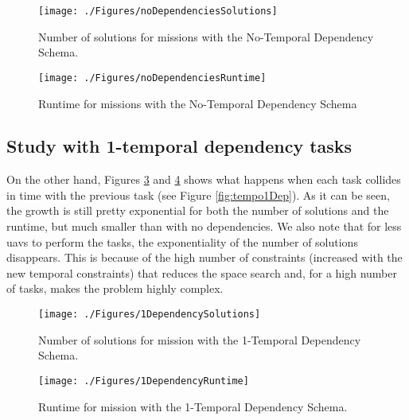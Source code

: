 		\begin{figure}[h]
			\centering
			\texttt{[image: ./Figures/noDependenciesSolutions]}
			\caption{Number of solutions for missions with the No-Temporal Dependency Schema.}
			\label{fig:noDependenciesSolutions}
		\end{figure}
		\begin{figure}[h]
			\centering
			\texttt{[image: ./Figures/noDependenciesRuntime]}
			\caption{Runtime for missions with the No-Temporal Dependency Schema}
			\label{fig:noDependenciesRuntime}
		\end{figure}

\subsection{Study with 1-temporal dependency tasks}
On the other hand, Figures \ref{fig:1DependencySolutions} and \ref{fig:1DependencyRuntime} shows what happens when each task collides in time with the previous task (see Figure \ref{fig:tempo1Dep}). As it can be seen, the growth is still pretty exponential for both the number of solutions and the runtime, but much smaller than with no dependencies. We also note that for less \glspl{uav} to perform the tasks, the exponentiality of the number of solutions disappears. This is because of the high number of constraints (increased with the new temporal constraints) that reduces the space search and, for a high number of tasks, makes the problem highly complex.

		\begin{figure}[h]
			\centering
			\texttt{[image: ./Figures/1DependencySolutions]}
			\caption{Number of solutions for mission with the 1-Temporal Dependency Schema.}
			\label{fig:1DependencySolutions}
		\end{figure}
		\begin{figure}[h]
			\centering
			\texttt{[image: ./Figures/1DependencyRuntime]}
			\caption{Runtime for mission with the 1-Temporal Dependency Schema.}
			\label{fig:1DependencyRuntime}
		\end{figure}

